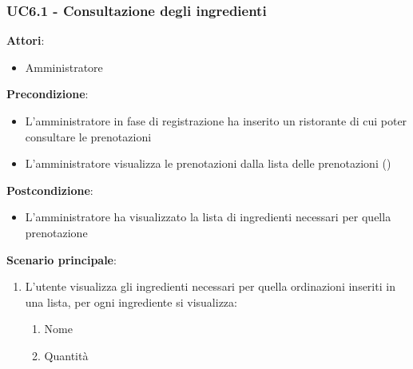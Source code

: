 \subsubsection{UC6.1 - Consultazione degli ingredienti}\label{usecase:6_1}
\textbf{Attori}:
\begin{itemize}
    \item Amministratore
\end{itemize}
\textbf{Precondizione}:
\begin{itemize}
    \item L'amministratore in fase di registrazione ha inserito un ristorante di cui poter consultare le prenotazioni
    \item L'amministratore visualizza le prenotazioni dalla lista delle prenotazioni ()
\end{itemize}
\textbf{Postcondizione}:
\begin{itemize}
    \item L'amministratore ha visualizzato la lista di ingredienti necessari per quella prenotazione
\end{itemize}
\textbf{Scenario principale}:
\begin{enumerate}
    \item L'utente visualizza gli ingredienti necessari per quella ordinazioni inseriti in una lista, per ogni ingrediente si visualizza:
    \begin{enumerate}
        \item Nome
        \item Quantità
    \end{enumerate}
\end{enumerate}